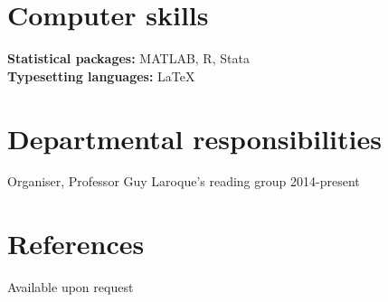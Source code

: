 \documentclass[margin,line]{res}
\begin{document}
\begin{resume}
\section{\sc Computer skills}
\begin{small}
\newlength{\myo}
\newlength{\myp}
\newlength{\myq}
\textbf{Statistical packages: }\hspace{-\the\myp}\hspace{\the\myq}MATLAB, R, Stata\\
\textbf{Typesetting languages: }\hspace{-\the\myq}\hspace{\the\myq}LaTeX
\end{small}
\section{\sc Departmental responsibilities}
\begin{small}
Organiser, Professor Guy Laroque's reading group						\hfill 2014-present\\
\end{small}
\section{\sc References}
Available upon request\\
\end{resume}
\end{document}
